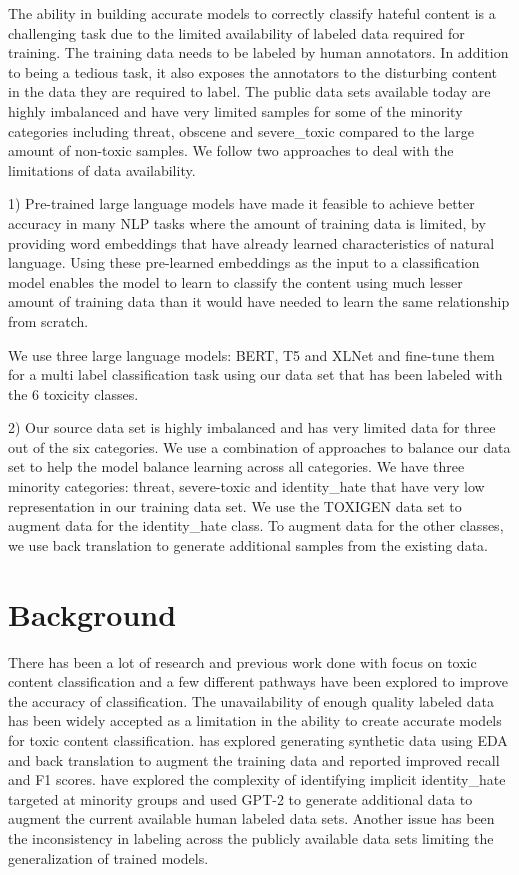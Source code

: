\documentclass[11pt,a4paper]{article}
\begin{document}
The ability in building accurate models to correctly classify hateful content is a challenging task due to the limited availability of labeled data required for training. The training data needs to be labeled by human annotators. In addition to being a tedious task, it also exposes the annotators to the disturbing content in the data they are required to label. The public data sets available today are highly imbalanced and have very limited samples for some of the minority categories including threat, obscene and severe\_toxic compared to the large amount of non-toxic samples. We follow two approaches to deal with the limitations of data availability.

1) Pre-trained large language models have made it feasible to achieve better accuracy  in many NLP tasks where the amount of training data is limited, by providing word embeddings that have already learned characteristics of natural language. Using these pre-learned embeddings as the input to a classification model enables the model to learn to classify the content using much lesser amount of training data than it would have needed to learn the same relationship from scratch.

We use three large language models: BERT, T5 and XLNet and fine-tune them for a multi label classification task using our data set that has been labeled with the 6 toxicity classes. 

2) Our source data set is highly imbalanced and has very limited data for three out of the six categories. We use a combination of approaches to balance our data set to help the model balance learning across all categories. 
We have three minority categories: threat, severe-toxic and identity\_hate that have very low representation in our training data set. We use the TOXIGEN \cite{hartvigsen2022toxigen} data set to augment data for the identity\_hate class. To augment data for the other classes, we use back translation to generate additional samples from the existing data. 


\section{Background}
There has been a lot of research and previous work done with focus on toxic content  classification and a few different pathways have been explored to improve the accuracy of classification. 
The unavailability of enough quality labeled data has been widely accepted as a limitation in the ability to create accurate models for toxic content classification. \cite{rastogi2020can} has explored generating synthetic data using EDA and back translation to augment the training data and reported improved recall and F1 scores. \cite{hartvigsen2022toxigen} have explored the complexity of identifying implicit identity\_hate targeted at minority groups and used GPT-2 to generate additional data to augment the current available human labeled data sets. 
Another issue has been the inconsistency in labeling across the publicly available data sets limiting the generalization of trained models. 
\end{document}

